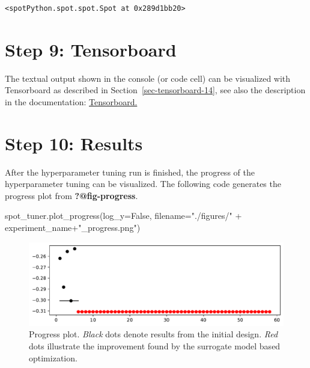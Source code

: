 \documentclass[
  letterpaper,
  DIV=11,
  numbers=noendperiod]{scrreprt}
\newenvironment{Shaded}{\begin{snugshade}}{\end{snugshade}}
\newcommand{\NormalTok}[1]{\textcolor[rgb]{0.00,0.23,0.31}{#1}}
\newcommand{\OperatorTok}[1]{\textcolor[rgb]{0.37,0.37,0.37}{#1}}
\newcommand{\StringTok}[1]{\textcolor[rgb]{0.13,0.47,0.30}{#1}}
\newcommand{\VariableTok}[1]{\textcolor[rgb]{0.07,0.07,0.07}{#1}}
\begin{document}
\begin{verbatim}
<spotPython.spot.spot.Spot at 0x289d1bb20>
\end{verbatim}

\hypertarget{sec-tensorboard-19}{%
\section{Step 9: Tensorboard}\label{sec-tensorboard-19}}

The textual output shown in the console (or code cell) can be visualized
with Tensorboard as described in Section~\ref{sec-tensorboard-14}, see
also the description in the documentation:
\href{https://sequential-parameter-optimization.github.io/spotPython/14_spot_ray_hpt_torch_cifar10.html\#sec-tensorboard-14}{Tensorboard.}

\hypertarget{sec-results-tuning-19}{%
\section{Step 10: Results}\label{sec-results-tuning-19}}

After the hyperparameter tuning run is finished, the progress of the
hyperparameter tuning can be visualized. The following code generates
the progress plot from \textbf{?@fig-progress}.

\begin{Shaded}
\begin{Highlighting}[]
\NormalTok{spot\_tuner.plot\_progress(log\_y}\OperatorTok{=}\VariableTok{False}\NormalTok{,}
\NormalTok{    filename}\OperatorTok{=}\StringTok{"./figures/"} \OperatorTok{+}\NormalTok{ experiment\_name}\OperatorTok{+}\StringTok{"\_progress.png"}\NormalTok{)}
\end{Highlighting}
\end{Shaded}

\begin{figure}[H]

{\centering \includegraphics{19_spot_hpt_sklearn_multiclass_classification_knn_files/figure-pdf/cell-26-output-1.pdf}

}

\caption{Progress plot. \emph{Black} dots denote results from the
initial design. \emph{Red} dots illustrate the improvement found by the
surrogate model based optimization.}

\end{figure}
\end{document}
